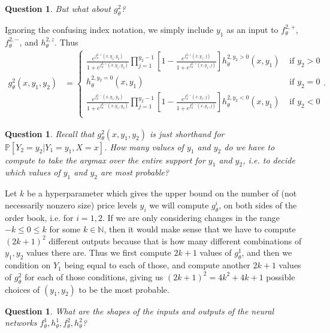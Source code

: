 \documentclass[12pt, reqno]{amsart}
\theoremstyle{definition}
\theoremstyle{definition}
\theoremstyle{plain}
\newtheorem{Ques}[theorem]{Question}
\theoremstyle{definition}
\theoremstyle{remark}
\newcommand{\n}{\mathbb{N}}				%
\newcommand{\bee}{\begin{equation}\begin{aligned}}
\newcommand{\eee}{\end{aligned}\end{equation}}
\newcommand{\fracc}{\frac}				%
\newcommand{\lbrac}{\left[}				%
\newcommand{\rbrac}{\right]}
\renewcommand{\leq}{\leqslant}			%
\renewcommand{\'}{\hspace{0.5mm}'}			%
\begin{document}
\begin{Ques}
	But what about $g_\theta^2$?
\end{Ques}

Ignoring the confusing index notation, we simply include $y_1$ as an input to $f_\theta^{2,+}$, $f_\theta^{2,-}$, and $h_\theta^{2,z}$. Thus
\bee
	g_\theta^2(x,y_1, y_2)
	&=
	\begin{cases}
		\displaystyle\fracc{
			e^{f_\theta^{2,+}(x,y_1,y_2)}
		}{
			1 + e^{f_\theta^{2,+}(x,y_1,y_2)}
		}
		\displaystyle\prod_{j = 1}^{y_2 - 1}
		\lbrac 
			1 - 
			\fracc{
				e^{f_\theta^{2,+}(x,y_1,j)}
			}{
				1 + e^{f_\theta^{2,+}(x,y_1,j)}
			}
		\rbrac
		h_\theta^{2, y_2 > 0}(x,y_1)
		& \text{ if } y_2 > 0
		\\
		\displaystyle h_\theta^{2, y_2 = 0}(x,y_1)
		& \text{ if } y_2 = 0
		\\
		\displaystyle\fracc{
			e^{f_\theta^{2,-}(x,y_1,y_2)}
		}{
			1 + e^{f_\theta^{2,-}(x,y_1,y_2)}
		}
		\displaystyle\prod_{j = 1}^{y_2 - 1}
		\lbrac 
			1 - 
			\fracc{
				e^{f_\theta^{2,-}(x,y_1,j)}
			}{
				1 + e^{f_\theta^{2,-}(x,y_1,j)}
			}
		\rbrac
		h_\theta^{2, y_2 < 0}(x,y_1)
		& \text{ if } y_2 < 0
		\\
	\end{cases}.
\eee

\begin{Ques}
	Recall that $g_\theta^{2}(x,y_1,y_2)$ is just shorthand for $\mathbb{P}[Y_2 = y_2|Y_1 = y_1, X = x]$. How many values of $y_1$ and $y_2$ do we have to compute to take the argmax over the entire support for $y_1$ and $y_2$, i.e. to decide which values of $y_1$ and $y_2$ are most probable?
\end{Ques}

Let $k$ be a hyperparameter which gives the upper bound on the number of (not necessarily nonzero size) price levels $y_i$ we will compute $g_\theta^i$, on both sides of the order book, i.e. for $i = 1,2$. 
If we are only considering changes in the range $-k \leq 0 \leq k$ for some $k \in \n$, then it would make sense that we have to compute $(2k + 1)^2$ different outputs because that is how many different combinations of $y_1,y_2$ values there are. Thus we first compute $2k + 1$ values of $g_\theta^1$, and then we condition on $Y_1$ being equal to each of those, and compute another $2k + 1$ values of $g_\theta^2$ for each of those conditions, giving us $(2k + 1)^2 = 4k^2 + 4k + 1$ possible choices of $(y_1,y_2)$ to be the most probable. 

\begin{Ques}
	What are the shapes of the inputs and outputs of the neural networks $f_\theta^{1}, h_\theta^1, f_\theta^2, h_\theta^2$?
\end{Ques}
\end{document}

